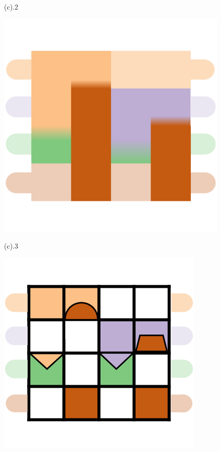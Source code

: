 \begin{figure}[h]
\begin{minipage}{0.24\linewidth}
		\vspace{-1 pt}
		\centerline{(c).2}
		\centerline{\includegraphics[width=\textwidth]{Fig/33.png}}
		\vspace{-1pt}
		\centerline{(c).3}
	\end{minipage}
	\begin{minipage}{0.24\linewidth}
		\centerline{\includegraphics[width=\textwidth]{Fig/41.png}}

\end{minipage}
\end{figure}
